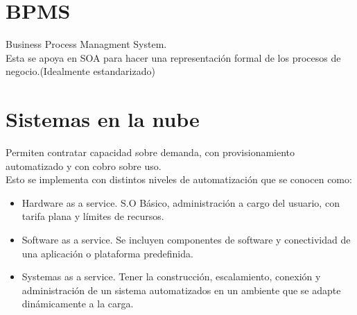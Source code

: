 \chapter{BPMS}
Business Process Managment System.\\
Esta se apoya en SOA para hacer una representaci\'{o}n formal de los procesos de negocio.(Idealmente estandarizado)\\

\chapter{Sistemas en la nube}
Permiten contratar capacidad sobre demanda, con provisionamiento automatizado y con cobro sobre uso.\\
Esto se implementa con distintos niveles de automatizaci\'{o}n que se conocen como:\\
\begin{itemize}
	\item Hardware as a service. S.O B\'{a}sico, administraci\'{o}n a cargo del usuario, con tarifa plana y l\'{i}mites de recursos.
	\item Software as a service. Se incluyen componentes de software y conectividad de una aplicaci\'{o}n o plataforma predefinida.
	\item Systemas as a service. Tener la construcci\'{o}n, escalamiento, conexi\'{o}n y administraci\'{o}n de un sistema automatizados en un ambiente que se adapte din\'{a}micamente a la carga.
\end{itemize}

